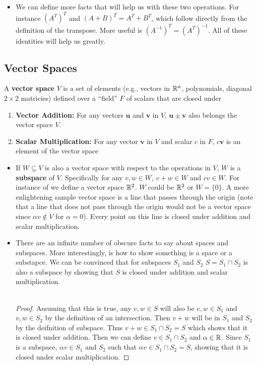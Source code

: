 \documentclass[11pt]{article}
\begin{document}
\begin{itemize}
\item We can define more facts that will help us with these two operations. For instance $(A^T)^T$ and $(A+B)^{T} = A^{T}+B^{T}$, which follow directly from the definition of the transpose. More useful is $\boxed{(A^{-1})^{T} = (A^{T})^{-1}}$. All of these identities will help us greatly.
\end{itemize}
\subsection{Vector Spaces}
\begin{ideabox}[Definition]
    A \textbf{vector space} $V$ is a set of elements (e.g., vectors in $\mathbb{R}^{n}$, polynomials, diagonal $2 \times 2$ matricies) defined over a ``field'' $F$ of scalars that are closed under
	\begin{enumerate}
		\item \textbf{Vector Addition: } For any vectors $\bm{u}$ and $\bm{v}$ in $V$, $\bm{u} \pm \bm{v}$ also belongs the vector space $V$.
		\item \textbf{Scalar Multiplication: }For any vector $\bm{v}$ in $V$ and scalar $c$ in $F$, $c\bm{v}$ is an element of the vector space
	\end{enumerate}
\end{ideabox}
\begin{itemize}
	\item If $W \subseteq V$ is also a vector space with respect to the operations in $V$, $W$ is a \textbf{subspace} of $V$. Specifically for any $v, w \in W$, $v+w \in W$ and $cv \in W$. For instance of we define a vector space $\mathbb{R}^2$. $W$ could be $\mathbb{R}^2$ or $W= \{0\}$. A more enlightening sample vector space is a line that passes through the origin (note that a line that does not pass through the origin would not be a vector space since $\alpha v \not \in V$ for $\alpha =0$). Every point on this line is closed under addition and scalar multiplication.
	\item There are an infinite number of obscure facts to say about spaces and subspaces. More interestingly, is how to show something is a space or a substapce. We can be convinced that for subspaces $S_{1}$ and $S_{2}$ $S = S_{1} \cap S_{2}$ is also a subspace by showing that $S$ is closed under addition and scalar multiplication.
		\\\\
		\begin{proof} Assuming that this is true, any $v, w \in S$ will also be $v, w \in S_{1}$ and $v,w \in S_{2}$ by the definition of an intersection. Then $v+w$ will be in	$S_{1}$ and $S_{2}$ by the deifnition of subspace. Thus $v+w \in S_{1} \cap S_{2} =S$ which shows that it is closed under addition. Then we can define $v \in S_{1} \cap S_{2}$ and $\alpha \in \mathbb{R}$. Since $S_{1}$ is a subspace, $\alpha v \in S_{1}$ and $S_{2}$ such that $\alpha v \in S_{1} \cap S_{2}=S$, showing that it is closed under scalar multiplication. 
		\end{proof}
	\end{itemize}
\end{document}
